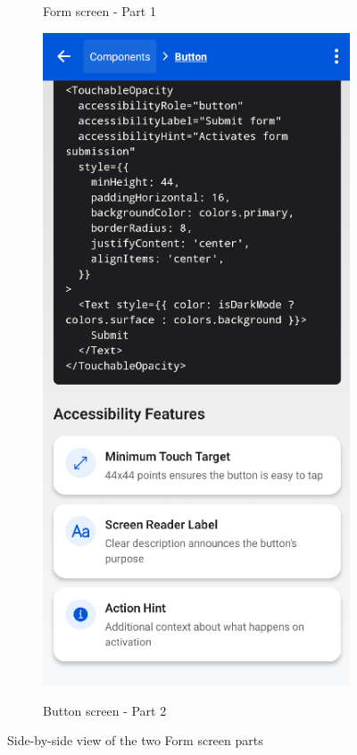 \begin{figure}[ht]
\begin{subfigure}[b]{0.48\textwidth}
        \caption{Form screen - Part 1}
        \label{fig:form-left}
    \end{subfigure}
    \hfill
    \begin{subfigure}[b]{0.48\textwidth}
        \centering
        \includegraphics[width=\linewidth, alt={Second part of the Form Screen}]{img/button2.png}
        \caption{Button screen - Part 2}
        \label{fig:form-right}
    \end{subfigure}
    \caption{Side-by-side view of the two Form screen parts}
    \label{fig:form_screens_sidebyside}
\end{figure}

